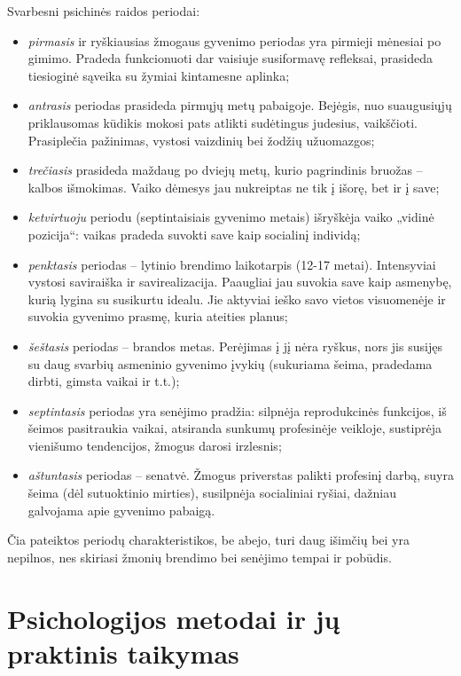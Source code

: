 Svarbesni psichinės raidos periodai:
\begin{itemize}
  \item \emph{pirmasis} ir ryškiausias žmogaus gyvenimo periodas yra 
    pirmieji mėnesiai po gimimo. Pradeda funkcionuoti dar vaisiuje 
    susiformavę refleksai, prasideda tiesioginė sąveika su žymiai 
    kintamesne aplinka;
  \item \emph{antrasis} periodas prasideda pirmųjų metų pabaigoje. 
    Bejėgis, nuo suaugusiųjų priklausomas kūdikis mokosi pats atlikti 
    sudėtingus judesius, vaikščioti. Prasiplečia pažinimas, vystosi 
    vaizdinių bei žodžių užuomazgos;
  \item \emph{trečiasis} prasideda maždaug po dviejų metų, kurio 
    pagrindinis bruožas – kalbos išmokimas. Vaiko dėmesys jau nukreiptas ne 
    tik į išorę, bet ir į save;
  \item \emph{ketvirtuoju} periodu (septintaisiais gyvenimo metais) 
    išryškėja vaiko „vidinė pozicija“: vaikas pradeda suvokti save kaip 
    socialinį individą;
  \item \emph{penktasis} periodas – lytinio brendimo laikotarpis 
    (12-17 metai). Intensyviai vystosi saviraiška ir 
    savirealizacija. Paaugliai jau suvokia save kaip asmenybę, kurią lygina 
    su susikurtu idealu. Jie aktyviai ieško savo vietos visuomenėje ir 
    suvokia gyvenimo prasmę, kuria ateities planus;
  \item \emph{šeštasis} periodas – brandos metas. Perėjimas į jį nėra 
    ryškus, nors jis susijęs su daug svarbių asmeninio gyvenimo įvykių 
    (sukuriama šeima, pradedama dirbti, gimsta vaikai ir t.t.);
  \item \emph{septintasis} periodas yra senėjimo pradžia: silpnėja 
    reprodukcinės funkcijos, iš šeimos pasitraukia vaikai, atsiranda 
    sunkumų profesinėje veikloje, sustiprėja vienišumo tendencijos, žmogus 
    darosi irzlesnis;
  \item \emph{aštuntasis} periodas – senatvė. Žmogus priverstas palikti 
    profesinį darbą, suyra šeima (dėl sutuoktinio mirties), susilpnėja 
    socialiniai ryšiai, dažniau galvojama apie gyvenimo pabaigą.
\end{itemize}

Čia pateiktos periodų charakteristikos, be abejo, turi daug išimčių bei yra 
nepilnos, nes skiriasi žmonių brendimo bei senėjimo tempai ir pobūdis.

\section{Psichologijos metodai ir jų praktinis taikymas}

